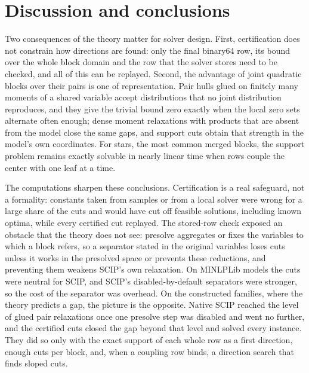 \section{Discussion and conclusions}\label{sec:conclusions}

Two consequences of the theory matter for solver design. First,
certification does not constrain how directions are found: only the final
binary64 row, its bound over the whole block domain and the row that the
solver stores need to be checked, and all of this can be replayed. Second,
the advantage of joint quadratic blocks over their pairs is one of
representation. Pair hulls glued on finitely many moments of a shared
variable accept distributions that no joint distribution reproduces, and they
give the trivial bound zero exactly when the local zero sets alternate often
enough; dense moment relaxations with products that are absent from the model
close the same gaps, and support cuts obtain that strength in the model's own
coordinates. For stars, the most common merged blocks, the support problem
remains exactly solvable in nearly linear time when rows couple the center
with one leaf at a time.

The computations sharpen these conclusions. Certification is a real
safeguard, not a formality: constants taken from samples or from a local
solver were wrong for a large share of the cuts and would have cut off
feasible solutions, including known optima, while every certified cut
replayed. The stored-row check exposed an obstacle that the theory does not
see: presolve aggregates or fixes the variables to which a block refers, so a
separator stated in the original variables loses cuts unless it works in the
presolved space or prevents these reductions, and preventing them weakens
SCIP's own relaxation. On MINLPLib models the cuts were neutral for SCIP, and
SCIP's disabled-by-default separators were stronger, so the cost of the
separator was overhead. On the constructed families, where the theory predicts
a gap, the picture is the opposite. Native SCIP reached the level of glued pair
relaxations once one presolve step was disabled and went no further, and the
certified cuts closed the gap beyond that level and solved every instance. They
did so only with the exact support of each whole row as a first direction,
enough cuts per block, and, when a coupling row binds, a direction search that
finds sloped cuts.

